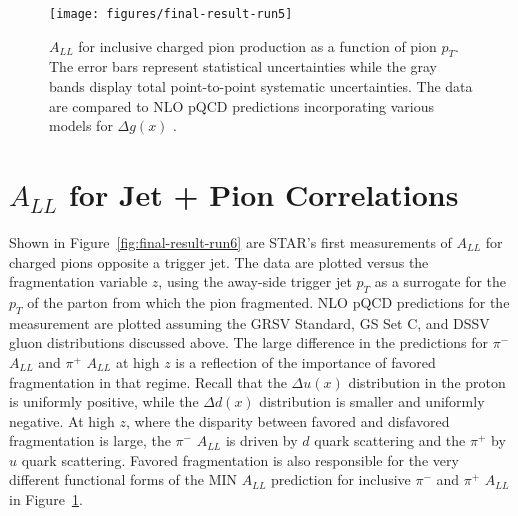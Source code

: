 \begin{figure}[ht]
  \texttt{[image: figures/final-result-run5]}
  \caption{$A_{LL}$ for inclusive charged pion production as a function of pion $p_T$.  The error bars represent statistical uncertainties while the gray bands display total point-to-point systematic uncertainties.  The data are compared to NLO pQCD predictions incorporating various models for $\Delta g(x)$ \cite{}.}
  \label{fig:final-result-run5}
\end{figure}

\section{$A_{LL}$ for Jet + Pion Correlations}

Shown in Figure~\ref{fig:final-result-run6} are STAR's first measurements of
\(A_{LL}\) for charged pions opposite a trigger jet. The data are plotted versus
the fragmentation variable \(z\), using the away-side trigger jet \(p_T\) as a
surrogate for the \(p_T\) of the parton from which the pion fragmented. NLO pQCD
predictions for the measurement are plotted assuming the GRSV Standard, GS Set
C, and DSSV gluon distributions discussed above. The large difference in the
predictions for \(\pi^-\) \(A_{LL}\) and \(\pi^+\) \(A_{LL}\) at high \(z\) is a
reflection of the importance of favored fragmentation in that regime. Recall
that the \(\Delta u(x)\) distribution in the proton is uniformly positive, while
the \(\Delta d(x)\) distribution is smaller and uniformly negative. At high
\(z\), where the disparity between favored and disfavored fragmentation is
large, the \(\pi^-\) \(A_{LL}\) is driven by \(d\) quark scattering and the
\(\pi^+\) by \(u\) quark scattering. Favored fragmentation is also responsible
for the very different functional forms of the MIN \(A_{LL}\) prediction for
inclusive \(\pi^-\) and \(\pi^+\) \(A_{LL}\) in
Figure~\ref{fig:final-result-run5}.

